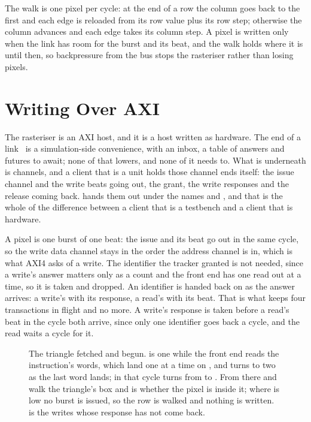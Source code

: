 \documentclass[journal,9pt]{IEEEtran}
\newcommand{\gpupart}[4]{%
}
\begin{document}
\gpupart{raster.rs}{run}{The rasteriser, a cycle at a time.}{lst:g-run}

The walk is one pixel per cycle: at the end of a row the column goes
back to the first and each edge is reloaded from its row value plus
its row step; otherwise the column advances and each edge takes its
column step. A pixel is written only when the link has room for the
burst and its beat, and the walk holds where it is until then, so
backpressure from the bus stops the rasteriser rather than losing
pixels.

\section{Writing Over AXI}
\label{sec:g-axi}

The rasteriser is an AXI host, and it is a host written as hardware.
The  end of a link~\cite{axi} is a simulation-side
convenience, with an inbox, a table of answers and futures to await;
none of that lowers, and none of it needs to. What is underneath is
channels, and a client that is a unit holds those channel ends
itself: the issue channel and the write beats going out, the grant,
the write responses and the release coming back. 
hands them out under the names  and
, and that is the whole of the difference between a
client that is a testbench and a client that is hardware.

A pixel is one burst of one beat: the issue and its beat go out in
the same cycle, so the write data channel stays in the order the
address channel is in, which is what AXI4 asks of a write. The
identifier the tracker granted is not needed, since a write's answer
matters only as a count and the front end has one read out at a time,
so it is taken and dropped. An identifier is handed back on
 as the answer arrives: a write's with its response, a
read's with its beat. That is what keeps four transactions in flight
and no more. A write's response is taken before a read's beat in the
cycle both arrive, since only one identifier goes back a cycle, and
the read waits a cycle for it.

\begin{figure}[htbp]
\centering

\caption{The triangle fetched and begun.  is one while
the front end reads the instruction's words, which land one at a
time on , and turns to two as the last word lands; in
that cycle  turns from  to . From
there  and  walk the triangle's box and  is
whether the pixel is inside it; where  is low no burst is
issued, so the row is walked and nothing is written. 
is the writes whose response has not come back.}
\label{fig:g-wave}
\end{figure}
\end{document}
